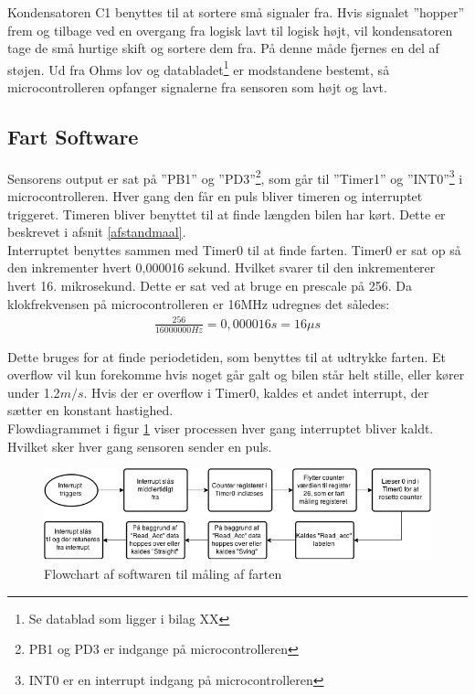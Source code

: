 Kondensatoren C1 benyttes til at sortere små signaler fra. Hvis signalet ”hopper” frem og tilbage ved en overgang fra logisk lavt til logisk højt, vil kondensatoren tage de små hurtige skift og sortere dem fra. På denne måde fjernes en del af støjen.  
Ud fra Ohms lov og databladet\footnote{Se datablad som ligger i bilag XX } er modstandene bestemt, så microcontrolleren opfanger signalerne fra sensoren som højt og lavt. \\ 


\subsection{Fart Software}
\label{fartmål_software}
Sensorens output er sat på ”PB1” og ”PD3”\footnote{PB1 og PD3 er indgange på microcontrolleren}, som går til ”Timer1” og ”INT0”\footnote{INT0 er en interrupt indgang på microcontrolleren} i microcontrolleren. Hver gang den får en puls  bliver timeren og interruptet triggeret. Timeren bliver benyttet til at finde længden bilen har kørt. Dette er beskrevet i afsnit \ref{afstandmaal}. \\

Interruptet benyttes sammen med Timer0 til at finde farten. Timer0 er sat op så den inkrementer hvert 0,000016 sekund. Hvilket svarer til den inkrementerer hvert 16. mikrosekund. Dette er sat ved at bruge en prescale på 256. Da klokfrekvensen på microcontrolleren er 16MHz udregnes det således:
\begin{align*}
\frac{256}{16 000 000Hz} = 0,000016 s = 16 \mu s 
\end{align*}

Dette bruges for at finde periodetiden, som benyttes til at udtrykke farten. Et overflow vil kun forekomme hvis noget går galt og bilen står helt stille, eller kører under 1.2\(m/s\). Hvis der er overflow i Timer0, kaldes et andet interrupt, der sætter en konstant hastighed. \\

Flowdiagrammet i figur \ref{fart_chart} viser processen hver gang interruptet bliver kaldt. Hvilket sker hver gang sensoren sender en puls. \\

\begin{figure}[h!]
\center
\includegraphics[scale=0.65]{./Graphics/fart_chart}
\caption{Flowchart af softwaren til måling af farten}
\label{fart_chart}
\end{figure}

